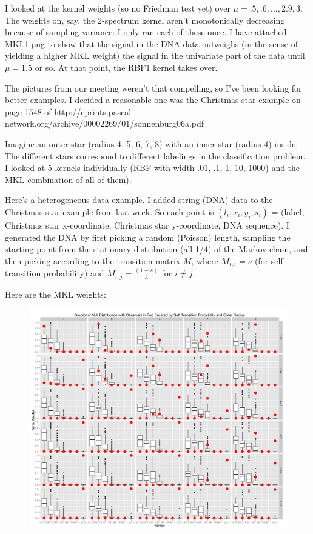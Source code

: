 I looked at the kernel weights (so no Friedman test yet) over $\mu = .5,
.6, \ldots, 2.9, 3$.  The weights on, say, the 2-spectrum kernel aren't
monotonically decreasing because of sampling variance: I only ran each
of these once.  I have attached MKL1.png to show that the signal in
the DNA data outweighs (in the sense of yielding a higher MKL weight)
the signal in the univariate part of the data until $\mu = 1.5$ or so.
At that point, the RBF1 kernel takes over.

The pictures from our meeting weren't that compelling, so I've been
looking for better examples.  I decided a reasonable one was the
Christmas star example on page 1548 of
http://eprints.pascal-network.org/archive/00002269/01/sonnenburg06a.pdf

Imagine an outer star (radius 4, 5, 6, 7, 8) with an inner star
(radius 4) inside.  The different stars correspond to different
labelings in the classification problem.  I looked at 5 kernels
individually (RBF with width .01, .1, 1, 10, 1000) and the MKL
combination of all of them).

Here's a heterogeneous data example.  I added string (DNA) data to the
Christmas star example from last week.  So each point is $(l_i, x_i,
y_i, s_i)$ = (label, Christmas star x-coordinate, Christmas star
y-coordinate, DNA sequence).  I generated the DNA by first picking a
random (Poisson) length, sampling the starting point from the
stationary distribution (all 1/4) of the Markov chain, and then
picking according to the transition matrix $M$, where $M_{i,i} = s$ (for
self transition probability) and $M_{i,j} = \frac{(1 - s)}{3}$ for $i \neq j$.

Here are the MKL weights:
\begin{figure}[!ht]
  \centering
    \includegraphics[scale=.3]{mkl_weight_boxplot_christmas_star_DNA.png}  
\end{figure}

